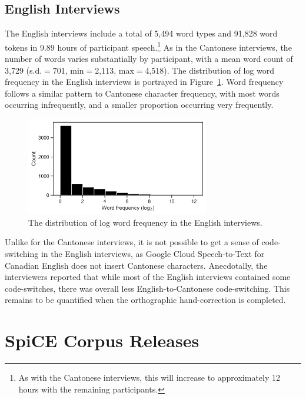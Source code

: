 \subsection{English Interviews}\label{ch2:subsec:english_descriptive}
The English interviews include a total of 5,494 word types and 91,828 word tokens in 9.89 hours of participant speech.\footnote{As with the Cantonese interviews, this will increase to approximately 12 hours with the remaining participants.} As in the Cantonese interviews, the number of words varies substantially by participant, with a mean word count of 3,729 (s.d.$=$701, min$=$2,113, max$=$4,518). The distribution of log word frequency in the English interviews is portrayed in Figure~\ref{ch2:fig:ewf}. Word frequency follows a similar pattern to Cantonese character frequency, with most words occurring infrequently, and a smaller proportion occurring very frequently.

\begin{figure}[!htbp]
\begin{center}
\includegraphics[width=8cm]{figures/2-eng_word_frequency.png} 
\caption{The distribution of log word frequency in the English interviews.}
\label{ch2:fig:ewf}
\end{center}
\end{figure}

Unlike for the Cantonese interviews, it is not possible to get a sense of code-switching in the English interviews, as Google Cloud Speech-to-Text for Canadian English does not insert Cantonese characters. Anecdotally, the interviewers reported that while most of the English interviews contained some code-switches, there was overall less English-to-Cantonese code-switching. This remains to be quantified when the orthographic hand-correction is completed.

\section{SpiCE Corpus Releases}\label{ch2:sec:releases}

